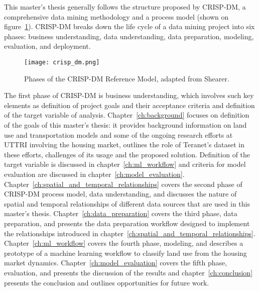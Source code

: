 This master's thesis generally follows the structure proposed by CRISP-DM, a comprehensive data mining methodology and a process model\cite{Shearer2000} (shown on figure~\ref{fig:crisp_dm}).
CRISP-DM breaks down the life cycle of a data mining project into six phases: business understanding, data understanding, data preparation, modeling, evaluation, and deployment.

\begin{figure}[hbt!]
    \centering
    \texttt{[image: crisp\_dm.png]}
    \caption{Phases of the CRISP-DM Reference Model, adapted from Shearer\cite{Shearer2000}.}
    \label{fig:crisp_dm}
\end{figure}

The first phase of CRISP-DM is business understanding, which involves such key elements as definition of project goals and their acceptance criteria and definition of the target variable of analysis\cite{Nisbet2018}.
Chapter~\ref{ch:background} focuses on definition of the goals of this master's thesis: it provides background information on land use and transportation models and some of the ongoing research efforts at UTTRI involving the housing market, outlines the role of Teranet's dataset in these efforts, challenges of its usage and the proposed solution.
Definition of the target variable is discussed in chapter~\ref{ch:ml_workflow} and criteria for model evaluation are discussed in chapter~\ref{ch:model_evaluation}.
Chapter~\ref{ch:spatial_and_temporal_relationships} covers the second phase of CRISP-DM process model, data understanding, and discusses the nature of spatial and temporal relationships of different data sources that are used in this master's thesis.
Chapter~\ref{ch:data_preparation} covers the third phase, data preparation, and presents the data preparation workflow designed to implement the relationships introduced in chapter~\ref{ch:spatial_and_temporal_relationships}.
Chapter~\ref{ch:ml_workflow} covers the fourth phase, modeling, and describes a prototype of a machine learning workflow to classify land use from the housing market dynamics.
Chapter~\ref{ch:model_evaluation} covers the fifth phase, evaluation, and presents the discussion of the results and chapter~\ref{ch:conclusion} presents the conclusion and outlines opportunities for future work.